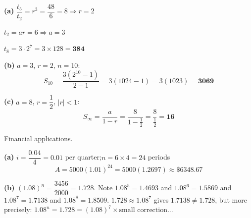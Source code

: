 \documentclass[addpoints]{exam}
\begin{document}
\begin{questions}
\begin{solution}[10cm]
\textbf{(a)} $\dfrac{t_5}{t_2} = r^3 = \dfrac{48}{6} = 8 \Rightarrow r = 2$

$t_2 = ar = 6 \Rightarrow a = 3$

$t_8 = 3 \cdot 2^7 = 3 \times 128 = \mathbf{384}$

\textbf{(b)} $a = 3$, $r = 2$, $n = 10$:
\[
S_{10} = \frac{3(2^{10}-1)}{2-1} = 3(1024-1) = 3(1023) = \mathbf{3069}
\]

\textbf{(c)} $a = 8$, $r = \dfrac{1}{2}$, $|r| < 1$:
\[
S_\infty = \frac{a}{1-r} = \frac{8}{1-\frac{1}{2}} = \frac{8}{\frac{1}{2}} = \mathbf{16}
\]
\end{solution}

\question Financial applications.
\begin{solution}[9cm]
\textbf{(a)} $i = \dfrac{0.04}{4} = 0.01$ per quarter;\quad $n = 6 \times 4 = 24$ periods
\[
A = 5000(1.01)^{24} = 5000(1.2697) \approx \mathbf{\$6348.67}
\]

\textbf{(b)} $(1.08)^n = \dfrac{3456}{2000} = 1.728$.
Note $1.08^5 = 1.4693$ and $1.08^6 = 1.5869$ and $1.08^7 = 1.7138$ and
$1.08^8 = 1.8509$.
$1.728 \approx 1.08^7$ gives $1.7138 \neq 1.728$, but more precisely:
$1.08^n = 1.728 = (1.08)^7 \times \text{small correction}$...


\end{solution}
\end{questions}
\end{document}
